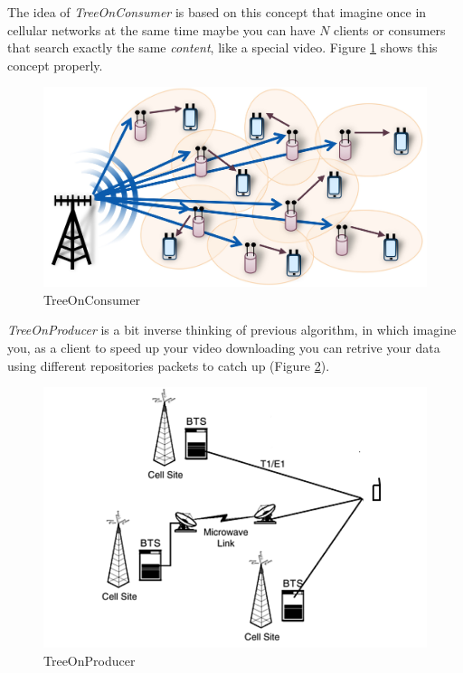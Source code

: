 The idea of \textit{TreeOnConsumer} is based on this concept that imagine once in cellular networks at the same time maybe you can have $N$ clients or consumers that search exactly the same \textit{content}, like a special video. Figure \ref{consumer} shows this concept properly.


\begin{figure}[H]

\begin{center}

\includegraphics[scale = 0.1]{Pictures/treeonconsumer.jpg}

\caption{TreeOnConsumer} \label{consumer} 

\end{center}

\end{figure}
     

\textit{TreeOnProducer} is a bit inverse thinking of previous algorithm, in which imagine you, as a client to speed up your video downloading you can retrive your data using different repositories packets to catch up (Figure \ref{producer}).

\begin{figure}[H]

\begin{center}

\includegraphics[scale = 0.4]{Pictures/treeonproducer.png}

\caption{TreeOnProducer} \label{producer} 

\end{center}

\end{figure}

